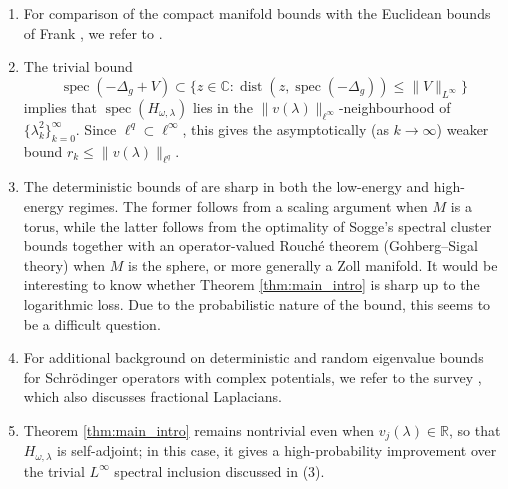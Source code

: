 \documentclass[12pt,reqno]{amsart}
\theoremstyle{definition}
\theoremstyle{remark}
\numberwithin{equation}{section}
\newcommand{\1}{\mathbbm{1}}
\DeclareMathOperator{\dist}{dist}
\DeclareMathOperator{\im}{Im}
\DeclareMathOperator{\re}{Re}
\DeclareMathOperator{\spec}{spec}
\begin{document}
\begin{enumerate}
\item For comparison of the compact manifold bounds with the Euclidean bounds of Frank \cite{MR2820160}, we refer to \cite[Section 4]{Cuenin2026}.

\item The trivial bound
\[
\spec(-\Delta_g+V)
\subset
\{z\in\mathbb{C}:\dist(z,\spec(-\Delta_g))\leq \|V\|_{L^\infty}\}
\]
implies that $\spec(H_{\omega,\lambda})$ lies in the $\|v(\lambda)\|_{\ell^\infty}$-neighbourhood of $\{\lambda_k^2\}_{k=0}^\infty$. Since $\ell^q \subset \ell^\infty$, this gives the asymptotically (as $k\to\infty$) weaker bound $r_k \leq \|v(\lambda)\|_{\ell^q}$. 

\item The deterministic bounds of \cite{Cuenin2026} are sharp in both the low-energy and high-energy regimes. The former follows from a scaling argument when $M$ is a torus, while the latter follows from the optimality of Sogge's spectral cluster bounds together with an operator-valued Rouch\'e theorem (Gohberg--Sigal theory) when $M$ is the sphere, or more generally a Zoll manifold. It would be interesting to know whether Theorem \ref{thm:main_intro} is sharp up to the logarithmic loss. Due to the probabilistic nature of the bound, this seems to be a difficult question.

\item For additional background on deterministic and random eigenvalue bounds for Schrödinger operators with complex potentials, we refer to the survey \cite{Stefanescu2026}, which also discusses fractional Laplacians.

\item Theorem \ref{thm:main_intro} remains nontrivial even when $v_j(\lambda) \in \mathbb{R}$, so that $H_{\omega,\lambda}$ is self-adjoint; in this case, it gives a high-probability improvement over the trivial $L^\infty$ spectral inclusion discussed in \textup{(3)}.

\end{enumerate}
\end{document}
